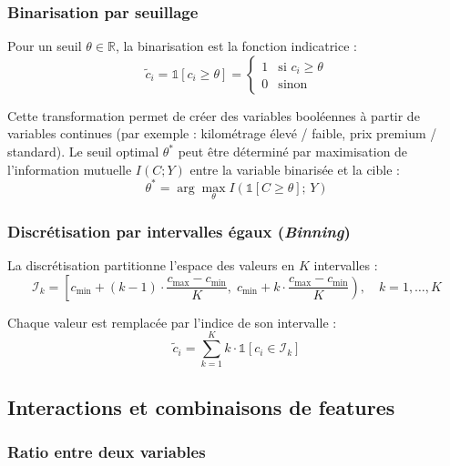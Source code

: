 \documentclass[12pt,a4paper]{article}
\newcounter{defcount}[section]
\newenvironment{definition}[1]{%
  \stepcounter{defcount}%
  \begin{tcolorbox}[defstyle={Définition \thesection.\thedefcount\ — #1}]
}{%
  \end{tcolorbox}
}
\begin{document}
\subsubsection{Binarisation par seuillage}

\begin{definition}{Binarisation}
Pour un seuil $\theta \in \mathbb{R}$, la binarisation est la fonction indicatrice :
\begin{equation}
  \tilde{c}_i = \mathbb{1}[c_i \geq \theta] =
  \begin{cases} 1 & \text{si } c_i \geq \theta \\ 0 & \text{sinon} \end{cases}
\end{equation}
\end{definition}

Cette transformation permet de créer des variables booléennes à partir de variables
continues (par exemple : kilométrage élevé / faible, prix premium / standard).
Le seuil optimal $\theta^*$ peut être déterminé par maximisation de l'information
mutuelle $I(C; Y)$ entre la variable binarisée et la cible :
\begin{equation}
  \theta^* = \arg\max_\theta I(\mathbb{1}[C \geq \theta];\, Y)
\end{equation}

\subsubsection{Discrétisation par intervalles égaux (\textit{Binning})}

La discrétisation partitionne l'espace des valeurs en $K$ intervalles :
\begin{equation}
  \mathcal{I}_k = \left[c_{\min} + (k-1)\cdot\frac{c_{\max}-c_{\min}}{K},\;
  c_{\min} + k\cdot\frac{c_{\max}-c_{\min}}{K}\right), \quad k = 1,\ldots,K
\end{equation}

Chaque valeur est remplacée par l'indice de son intervalle :
\begin{equation}
  \tilde{c}_i = \sum_{k=1}^{K} k \cdot \mathbb{1}[c_i \in \mathcal{I}_k]
\end{equation}

\subsection{Interactions et combinaisons de features}

\subsubsection{Ratio entre deux variables}
\end{document}
